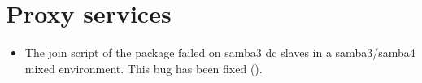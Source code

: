 
\section{Proxy services}
\begin{itemize}
\item The join script of the package  failed
on samba3 dc slaves in a samba3/samba4 mixed environment. This bug has been
fixed ().
\end{itemize}


%




